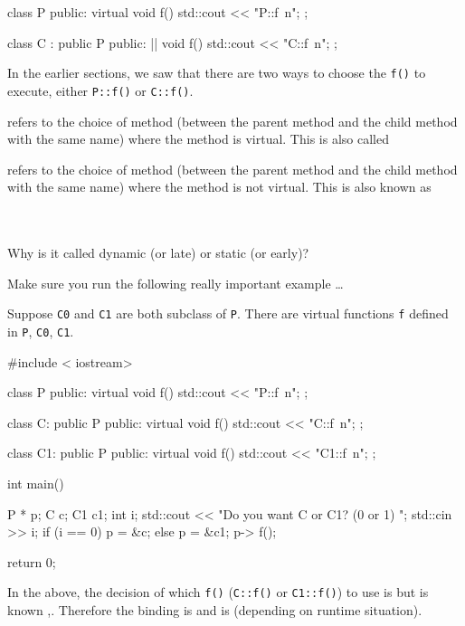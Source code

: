 \begin{consolethree}[escapeinside=||]
class P
{
public:
     virtual void f() { std::cout << "P::f\ n"; }
};

class C : public P
{
public:
     || void f() { std::cout << "C::f\ n"; }
}; 
\end{consolethree}

\newpage{}

In the earlier sections, we saw that there are two ways to choose the \verb!f()! to execute, either \verb!P::f()! or \verb!C::f()!.

 refers to the choice of method (between the parent method and the child method with the same name) where the method is virtual. This is also called 

 refers to the choice of method (between the parent method and the child method with the same name) where the method is not virtual. This is also known as 

\\
\\

Why is it called dynamic (or late) or static (or early)?

Make sure you run the following really important example \ldots

Suppose \verb!C0! and \verb!C1! are both subclass of \verb!P!. There are virtual functions \verb!f! defined in \verb!P!, \verb!C0!, \verb!C1!.

\begin{console}
#include < iostream>

class P
{
public:
     virtual void f() { std::cout << "P::f\ n"; }
};

class C: public P
{
public:
     virtual void f() { std::cout << "C::f\ n"; }
};

class C1: public P
{
public:
     virtual void f() { std::cout << "C1::f\ n"; }
};

int main()
{   
    P * p;
    C c;
    C1 c1;
    int i;
    std::cout << "Do you want C or C1? (0 or 1) ";
    std::cin >> i;
    if (i == 0)
    {    
         p = &c;
    }
    else
    {
         p = &c1;
    }
    p-> f();
    
    return 0;
}
\end{console}

In the above, the decision of which \verb!f()! (\verb!C::f()! or \verb!C1::f()!) to use is  but is known ,. Therefore the binding is  and is  (depending on runtime situation).

